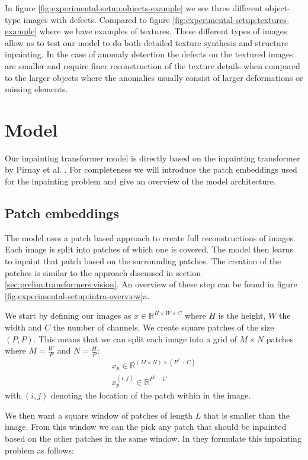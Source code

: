 In figure \ref{fig:experimental-setup:objects-example} we see three different object-type images with defects. Compared to figure \ref{fig:experimental-setup:textures-example} where we have examples of textures. These different types of images allow us to test our model to do both detailed texture synthesis and structure inpainting. In the case of anomaly detection the defects on the textured images are smaller and require finer reconstruction of the texture details when compared to the larger objects where the anomalies usually consist of larger deformations or missing elements.

\section{Model}
\label{sec:experimental-setup:model}

Our inpainting transformer model is directly based on the inpainting transformer by Pirnay et al. \cite{pirnay_inpainting_2021}. For completeness we will introduce the patch embeddings used for the inpainting problem and give an overview of the model architecture.

\subsection{Patch embeddings}

The model uses a patch based approach to create full reconstructions of images. Each image is split into patches of which one is covered. The model then learns to inpaint that patch based on the surrounding patches. The creation of the patches is similar to the approach discussed in section \ref{sec:prelim:transformers:vision}. An overview of these step can be found in figure \ref{fig:experimental-setup:intra-overview}a.

We start by defining our images as $x \in \mathbb{R}^{H \times W \times C}$ where $H$ is the height, $W$ the width and $C$ the number of channels. We create square patches of the size $(P, P)$. This means that we can split each image into a grid of $M \times N$ patches where $M = \frac{W}{P}$ and $N = \frac{H}{P}$:
%
\begin{align}
    x_p \in \mathbb{R}^{(M \times N) \times (P^2 \; \cdot \; C)}\\
    x_p^{(i,j)} \in \mathbb{R}^{P^2 \; \cdot \; C}
\end{align}
%
with $(i, j)$ denoting the location of the patch within in the image.

We then want a square window of patches of length $L$ that is smaller than the image. From this window we can the pick any patch that should be inpainted based on the other patches in the same window. In \cite{pirnay_inpainting_2021} they formulate this inpainting problem as follows:

